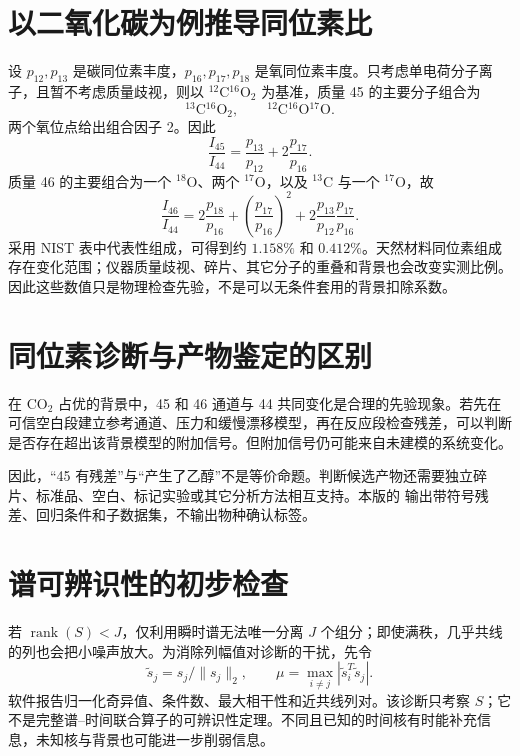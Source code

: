 \section{以二氧化碳为例推导同位素比}
设 $p_{12},p_{13}$ 是碳同位素丰度，$p_{16},p_{17},p_{18}$ 是氧同位素丰度。只考虑单电荷分子离子，且暂不考虑质量歧视，则以 $^{12}\mathrm C{}^{16}\mathrm O_2$ 为基准，质量 45 的主要分子组合为
\begin{equation}
^{13}\mathrm C{}^{16}\mathrm O_2,
\qquad ^{12}\mathrm C{}^{16}\mathrm O{}^{17}\mathrm O.
\end{equation}
两个氧位点给出组合因子 2。因此
\begin{equation}
\frac{I_{45}}{I_{44}}
=\frac{p_{13}}{p_{12}}+2\frac{p_{17}}{p_{16}}.
\end{equation}
质量 46 的主要组合为一个 $^{18}\mathrm O$、两个 $^{17}\mathrm O$，以及 $^{13}\mathrm C$ 与一个 $^{17}\mathrm O$，故
\begin{equation}
\frac{I_{46}}{I_{44}}
=2\frac{p_{18}}{p_{16}}
+\left(\frac{p_{17}}{p_{16}}\right)^2
+2\frac{p_{13}}{p_{12}}\frac{p_{17}}{p_{16}}.\label{eq:isotope46}
\end{equation}
采用 NIST 表中代表性组成，可得到约 $1.158\%$ 和 $0.412\%$\cite{nistC,nistO}。天然材料同位素组成存在变化范围\cite{ciaaw}；仪器质量歧视、碎片、其它分子的重叠和背景也会改变实测比例。因此这些数值只是物理检查先验，不是可以无条件套用的背景扣除系数。

\section{同位素诊断与产物鉴定的区别}
在 CO$_2$ 占优的背景中，45 和 46 通道与 44 共同变化是合理的先验现象。若先在可信空白段建立参考通道、压力和缓慢漂移模型，再在反应段检查残差，可以判断是否存在超出该背景模型的附加信号。但附加信号仍可能来自未建模的系统变化。

因此，“45 有残差”与“产生了乙醇”不是等价命题。判断候选产物还需要独立碎片、标准品、空白、标记实验或其它分析方法相互支持。本版的  输出带符号残差、回归条件和子数据集，不输出物种确认标签。

\section{谱可辨识性的初步检查}
若 $\operatorname{rank}(S)<J$，仅利用瞬时谱无法唯一分离 $J$ 个组分；即使满秩，几乎共线的列也会把小噪声放大。为消除列幅值对诊断的干扰，先令
\begin{equation}
\widetilde s_j=s_j/\|s_j\|_2,\qquad
\mu=\max_{i\ne j}|\widetilde s_i^T\widetilde s_j|.
\end{equation}
软件报告归一化奇异值、条件数、最大相干性和近共线列对。该诊断只考察 $S$；它不是完整谱--时间联合算子的可辨识性定理。不同且已知的时间核有时能补充信息，未知核与背景也可能进一步削弱信息。
